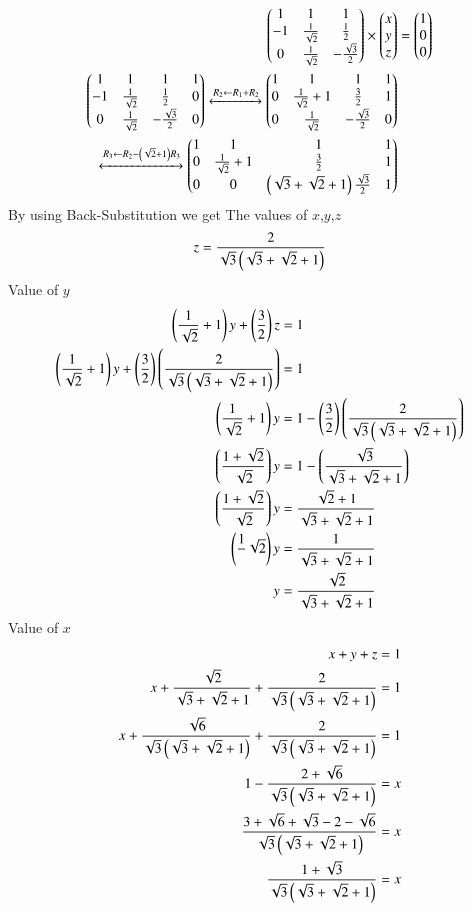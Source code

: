 \documentclass[journal]{IEEEtran}
\begin{document}
\begin{align}
  \begin{pmatrix}1 & 1 & 1\\-1 & \frac{1}{\sqrt{2}} & \frac{1}{2}\\0 & \frac{1}{\sqrt{2}} & -\frac{\sqrt{3}}{2}\end{pmatrix}\times\begin{pmatrix}x\\y\\z\end{pmatrix}&=\begin{pmatrix}1\\0\\0\end{pmatrix}\\
  \begin{pmatrix}1 & 1 & 1 & 1\\-1 & \frac{1}{\sqrt{2}} & \frac{1}{2} & 0\\0 & \frac{1}{\sqrt{2}} & -\frac{\sqrt{3}}{2} & 0\end{pmatrix} \xleftrightarrow[]{R_2 \leftarrow {R_1+R_2}}\begin{pmatrix}1 & 1 & 1 & 1\\0 & \frac{1}{\sqrt{2}}+1 & \frac{3}{2} & 1\\0 & \frac{1}{\sqrt{2}} & -\frac{\sqrt{3}}{2} & 0\end{pmatrix}\\
  \xleftrightarrow[]{R_3 \leftarrow {R_2-\ensuremath{\left(\sqrt{2}+1\right)}R_3}}\begin{pmatrix}1 & 1 & 1 & 1\\0 & \frac{1}{\sqrt{2}}+1 & \frac{3}{2} & 1\\0 & 0 & \left(\sqrt{3}+\sqrt{2}+1\right)\frac{\sqrt{3}}{2} & 1\end{pmatrix} 
\end{align}
By using Back-Substitution we get The values of $x$,$y$,$z$
\begin{align}
z=\frac{2}{\sqrt{3}\left(\sqrt{3}+\sqrt{2}+1\right)}
\end{align}
Value of $y$
\begin{align}
\left(\frac{1}{\sqrt{2}}+1\right)y+\left(\frac{3}{2}\right)z&=1\\
\left(\frac{1}{\sqrt{2}}+1\right)y+\left(\frac{3}{2}\right)\left(\frac{2}{\sqrt{3}\left(\sqrt{3}+\sqrt{2}+1\right)}\right)&=1\\
\left(\frac{1}{\sqrt{2}}+1\right)y&=1-\left(\frac{3}{2}\right)\left(\frac{2}{\sqrt{3}\left(\sqrt{3}+\sqrt{2}+1\right)}\right)\\
\left(\frac{1+\sqrt{2}}{\sqrt{2}}\right)y&=1-\left(\frac{\sqrt{3}}{\sqrt{3}+\sqrt{2}+1}\right)\\
\left(\frac{1+\sqrt{2}}{\sqrt{2}}\right)y&=\frac{\sqrt{2}+1}{\sqrt{3}+\sqrt{2}+1}\\
\left(\frac{1}{}\sqrt{2}\right)y&=\frac{1}{\sqrt{3}+\sqrt{2}+1}\\
y&=\frac{\sqrt{2}}{\sqrt{3}+\sqrt{2}+1}
\end{align}
Value of $x$
\begin{align}
x+y+z&=1\\
x+\frac{\sqrt{2}}{\sqrt{3}+\sqrt{2}+1}+\frac{2}{\sqrt{3}\left(\sqrt{3}+\sqrt{2}+1\right)}&=1\\
x+\frac{\sqrt{6}}{\sqrt{3}\left(\sqrt{3}+\sqrt{2}+1\right)}+\frac{2}{\sqrt{3}\left(\sqrt{3}+\sqrt{2}+1\right)}&=1\\
1-\frac{2+\sqrt{6}}{\sqrt{3}\left(\sqrt{3}+\sqrt{2}+1\right)}&=x\\
\frac{3+\sqrt{6}+\sqrt{3}-2-\sqrt{6}}{\sqrt{3}\left(\sqrt{3}+\sqrt{2}+1\right)}&=x\\
\frac{1+\sqrt{3}}{\sqrt{3}\left(\sqrt{3}+\sqrt{2}+1\right)}&=x
\end{align}
\end{document}
